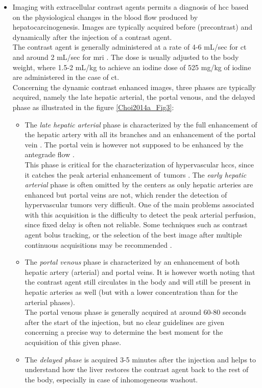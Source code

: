 \begin{itemize}
\item Imaging with extracellular contrast agents permits a diagnosis of
  \ac{hcc} based on the physiological changes in the blood flow
  produced by hepatocarcinogenesis. Images are typically acquired before (precontrast) and dynamically
  after the injection of a contrast agent.\\
  The contrast agent is generally administered at a rate of 4-6 mL/sec
  for \ac{ct} and around 2 mL/sec for \ac{mri} \cite{Schima2005, Frydrychowicz2012}. The dose is usually adjusted to the body weight, where 1.5-2
  mL/kg to achieve an iodine dose of 525 mg/kg of iodine are
  administered in the case of \ac{ct}.\\
  Concerning the dynamic contrast enhanced images, three phases are
  typically acquired, namely the late hepatic arterial, the portal
  venous, and the delayed phase as illustrated in the figure \ref{Choi2014a_Fig3}:
  \begin{itemize}
  \item The \emph{late hepatic arterial} phase is characterized by the full
    enhancement of the hepatic artery with all its branches and an
    enhancement of the portal vein \cite{Choi2014}.
    The portal vein is however not supposed to be enhanced by the
    antegrade flow \cite{Miraglia2007}.\\
    This phase is critical for the characterization of hypervascular
    \ac{hcc}s, since it catches the peak arterial enhancement
    of~tumors \cite{Kim2006}. The \emph{early
    hepatic arterial} phase is often omitted by the centers as only
    hepatic arteries are enhanced but portal veins are not, which render
    the detection of hypervascular tumors very difficult. One of the
    main problems associated with this acquisition is the difficulty to
    detect the peak arterial perfusion, since fixed delay is often not
    reliable. Some techniques such as contrast agent bolus tracking, or
    the selection of the best image after multiple continuous
    acquisitions may be recommended \cite{Earls1997}.
  \item The \emph{portal venous} phase is characterized by an enhancement of
    both hepatic artery (arterial) and portal veins. It is however worth
    noting that the contrast agent still circulates in the body and will
    still be present in hepatic arteries as well (but with a lower
    concentration than for the arterial phases).\\
    The portal venous phase is generally acquired at around 60-80
    seconds after the start of the injection, but no clear guidelines
    are given concerning a precise way to determine the best moment for
    the acquisition of this given phase.
  \item The \emph{delayed phase} is acquired 3-5 minutes after the injection
    and helps to understand how the liver restores the contrast agent
    back to the rest of the body, especially in case of inhomogeneous
    washout.
  \end{itemize}
\end{itemize}
